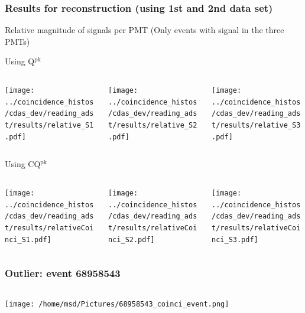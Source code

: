 \documentclass[aspectratio=169]{beamer}
\begin{document}
\begin{frame}
  \frametitle{Results for reconstruction (using 1st and 2nd data
  set)}
  Relative magnitude of signals per PMT
  (Only events with signal in the three PMTs)
  \vspace{0.3cm}

  Using Q$^{\mathrm{pk}}$ 
  \begin{columns}
    \centering
    \begin{column}{0.33\textwidth}
      \texttt{[image: ../coincidence\_histos/cdas\_dev/reading\_adst/results/relative\_S1.pdf]}
    \end{column}
    \begin{column}{0.33\textwidth}
      \texttt{[image: ../coincidence\_histos/cdas\_dev/reading\_adst/results/relative\_S2.pdf]}
    \end{column}
    \begin{column}{0.33\textwidth}
      \texttt{[image: ../coincidence\_histos/cdas\_dev/reading\_adst/results/relative\_S3.pdf]}
    \end{column}
  \end{columns}
  \vspace{0.2cm}
 
  Using CQ$^{\mathrm{pk}}$ 
  \begin{columns}
    \centering
    \begin{column}{0.33\textwidth}
      \texttt{[image: ../coincidence\_histos/cdas\_dev/reading\_adst/results/relativeCoinci\_S1.pdf]}
    \end{column}
    \begin{column}{0.33\textwidth}
      \texttt{[image: ../coincidence\_histos/cdas\_dev/reading\_adst/results/relativeCoinci\_S2.pdf]}
    \end{column}
    \begin{column}{0.33\textwidth}
      \texttt{[image: ../coincidence\_histos/cdas\_dev/reading\_adst/results/relativeCoinci\_S3.pdf]}
    \end{column}
  \end{columns}
\end{frame}

\begin{frame}
  \frametitle{Outlier: event 68958543}
  \vspace{0.2cm}

  \begin{columns}
    \centering
    \begin{column}{.85\textwidth}
      \texttt{[image: /home/msd/Pictures/68958543\_coinci\_event.png]}
    \end{column}
  \end{columns}
\end{frame}
\end{document}
